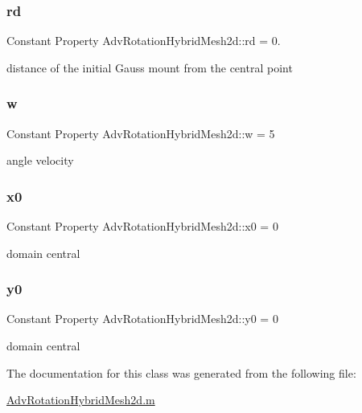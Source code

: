 \subsubsection{\texorpdfstring{rd}{rd}}
{\footnotesize\ttfamily Constant Property Adv\+Rotation\+Hybrid\+Mesh2d\+::rd = 0.}



distance of the initial Gauss mount from the central point 

\mbox{\label{class_adv_rotation_hybrid_mesh2d_a4f8367ec7e10d46d002d3d13df5ab8fe}} 
\subsubsection{\texorpdfstring{w}{w}}
{\footnotesize\ttfamily Constant Property Adv\+Rotation\+Hybrid\+Mesh2d\+::w = 5}



angle velocity 

\mbox{\label{class_adv_rotation_hybrid_mesh2d_a0b5b5cd98f5acfe3c681516cbbc15eac}} 
\subsubsection{\texorpdfstring{x0}{x0}}
{\footnotesize\ttfamily Constant Property Adv\+Rotation\+Hybrid\+Mesh2d\+::x0 = 0}



domain central 

\mbox{\label{class_adv_rotation_hybrid_mesh2d_ab815c80c7f05950970ad4f7682c3453c}} 
\subsubsection{\texorpdfstring{y0}{y0}}
{\footnotesize\ttfamily Constant Property Adv\+Rotation\+Hybrid\+Mesh2d\+::y0 = 0}



domain central 



The documentation for this class was generated from the following file\+:\begin{DoxyCompactItemize}
\item 
\hyperlink{_adv_rotation_hybrid_mesh2d_8m}{Adv\+Rotation\+Hybrid\+Mesh2d.\+m}\end{DoxyCompactItemize}
